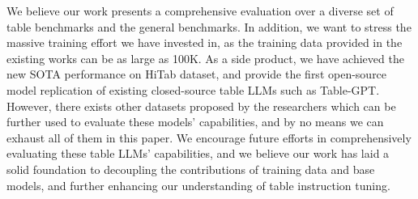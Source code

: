 \documentclass[11pt]{article}
\begin{document}
We believe our work presents a comprehensive evaluation over a diverse set of table benchmarks and the general benchmarks.
In addition, we want to stress the massive training effort we have invested in, as the training data provided in the existing works can be as large as 100K.
As a side product, we have achieved the new SOTA performance on HiTab dataset, and provide the first open-source model replication of existing closed-source table LLMs such as Table-GPT.
However, there exists other datasets proposed by the researchers which can be further used to evaluate these models' capabilities, and by no means we can exhaust all of them in this paper.
We encourage future efforts in comprehensively evaluating these table LLMs' capabilities, and we believe our work has laid a solid foundation to decoupling the contributions of training data and base models, and further enhancing our understanding of table instruction tuning.


\end{document}
